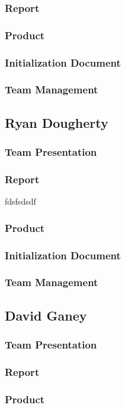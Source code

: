 \documentclass[12pt]{article}
\begin{document}
\begin{spacing}{1.5}
\subsubsection{Report}
\subsubsection{Product}
\subsubsection{Initialization Document}
\subsubsection{Team Management}
\subsection{Ryan Dougherty}
\subsubsection{Team Presentation}
\subsubsection{Report}
fdsfsdsdf
\subsubsection{Product}
\subsubsection{Initialization Document}
\subsubsection{Team Management}
\subsection{David Ganey}
\subsubsection{Team Presentation}
\subsubsection{Report}
\subsubsection{Product}

\end{spacing}
\end{document}
